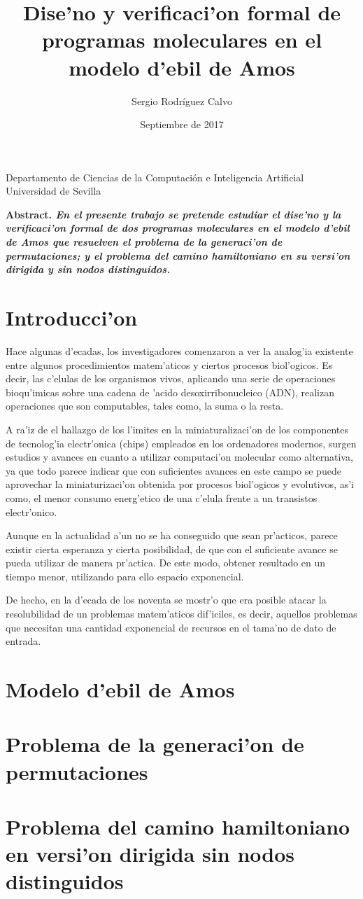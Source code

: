 \documentclass[12pt]{article}
\title{Dise'no y verificaci'on formal de programas moleculares en el modelo d'ebil de Amos}
\author{Sergio Rodr\'iguez Calvo}
\date{Septiembre de 2017}
\begin{document}
    \maketitle
    \thispagestyle{empty}
    \begin{center}
      Departamento de Ciencias de la Computaci\'on e
      Inteligencia Artificial \\
      Universidad de Sevilla
      \end{center}
  \bf{Abstract. }\rm
    \emph{En el presente trabajo se pretende estudiar el dise'no y la verificaci'on formal
    de dos programas moleculares en el modelo d'ebil de Amos que resuelven el problema de la generaci'on
    de permutaciones; y el problema del camino hamiltoniano en su versi'on dirigida y sin
    nodos distinguidos.}

\section{Introducci'on}

Hace algunas d'ecadas, los investigadores comenzaron a ver la analog'ia existente entre algunos
procedimientos matem'aticos y ciertos procesos biol'ogicos. Es decir, las c'elulas de los organismos
vivos, aplicando una serie de operaciones bioqu'imicas sobre una cadena de 'acido desoxirribonucleico (ADN),
realizan operaciones que son computables, tales como, la suma o la resta.

A ra'iz de el hallazgo de los l'imites en la miniaturalizaci'on de los componentes de tecnolog'ia electr'onica (chips)
empleados en los ordenadores modernos, surgen estudios y avances en cuanto a utilizar computaci'on
molecular como alternativa, ya que todo parece indicar que con suficientes avances en este campo
se puede aprovechar la miniaturizaci'on obtenida por procesos biol'ogicos y evolutivos, as'i como, el
menor consumo energ'etico de una c'elula frente a un transistos electr'onico.

Aunque en la actualidad a'un no se ha conseguido que sean pr'acticos, parece existir cierta esperanza y
cierta posibilidad, de que con el suficiente avance se pueda utilizar de manera pr'actica. De este modo,
obtener resultado en un tiempo menor, utilizando para ello espacio exponencial.

De hecho, en la d'ecada de los noventa se mostr'o que era posible atacar la resolubilidad de un problemas
matem'aticos dif'iciles, es decir, aquellos problemas que necesitan una cantidad exponencial de recursos
en el tama'no de dato de entrada.

\section{Modelo d'ebil de Amos}

\section{Problema de la generaci'on de permutaciones}

\section{Problema del camino hamiltoniano en versi'on dirigida sin nodos distinguidos}

\printbibliography
\end{document}

